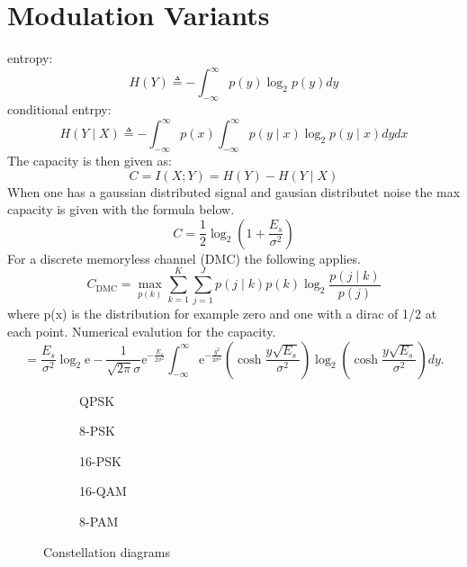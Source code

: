 \section{Modulation Variants}
entropy:
\begin{equation}
H(Y) \triangleq-\int_{-\infty}^{\infty} p(y) \log _2 p(y) d y
\end{equation}
conditional entrpy:
\begin{equation}
H(Y \mid X) \triangleq-\int_{-\infty}^{\infty} p(x) \int_{-\infty}^{\infty} p(y \mid x) \log _2 p(y \mid x) d y d x
\end{equation}
The capacity is then given as:
\begin{equation}
C=I(X ; Y)=H(Y)-H(Y \mid X)
\end{equation}
When one has a gaussian distributed signal and gausian distributet noise the max capacity is given with the formula below.
\begin{equation}
C=\frac{1}{2} \log _2\left(1+\frac{E_s}{\sigma^2}\right)
\end{equation}
For a discrete memoryless channel (DMC) the following applies.
\begin{equation}
C_{\mathrm{DMC}}=\max _{p(k)} \sum_{k=1}^K \sum_{j=1}^J p(j \mid k) p(k) \log _2 \frac{p(j \mid k)}{p(j)}
\end{equation}
where p(x) is the distribution for example zero and one with a dirac of 1/2 at each point.
Numerical evalution for the capacity.
\begin{equation}
=\frac{E_s}{\sigma^2} \log _2 \mathrm{e}-\frac{1}{\sqrt{2 \pi} \sigma} \mathrm{e}^{-\frac{E_s}{2 \sigma^2}} \int_{-\infty}^{\infty} \mathrm{e}^{-\frac{y^2}{2 \sigma^2}}\left(\cosh \frac{y \sqrt{E_s}}{\sigma^2}\right) \log _2\left(\cosh \frac{y \sqrt{E_s}}{\sigma^2}\right) d y .
\end{equation}

\begin{figure}[ht]

    \begin{subfigure}[t]{0.3\linewidth}
\caption{QPSK}\label{subfig:qpsk}
    \end{subfigure}
 \hfil
    \begin{subfigure}[t]{0.3\linewidth}
\caption{8-PSK}\label{subfig:8-psk}
    \end{subfigure}
\hfil
    \begin{subfigure}[t]{0.3\linewidth}
\caption{16-PSK}\label{subfig:16-psk}
    \end{subfigure}

    \begin{subfigure}[t]{0.3\linewidth}
\caption{16-QAM}\label{subfig:16-qam}
    \end{subfigure}
    \hfil
    \begin{subfigure}[t]{0.69\linewidth}
\caption{8-PAM}\label{subfig:16-qam}
    \end{subfigure}
%
\caption{Constellation diagrams}
\end{figure}
\FloatBarrier 
